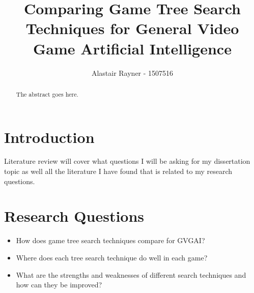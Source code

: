 \documentclass[journal]{IEEEtran}
\begin{document}
%
\title{Comparing Game Tree Search Techniques for General Video Game Artificial Intelligence}
%
%
\author{Alastair Rayner - 1507516}


\maketitle

\begin{abstract}
The abstract goes here.
\end{abstract}

\section{Introduction}
 Literature review will cover what questions I will be asking for my dissertation topic as well all the literature I have found that is related to my research questions.





\section{Research Questions}

\begin{itemize}
    \item How does game tree search techniques compare for GVGAI? 
    \item Where does each tree search technique do well in each game? 
    \item What are the strengths and weaknesses of different search techniques and how can they be improved? 
\end{itemize}
\end{document}
